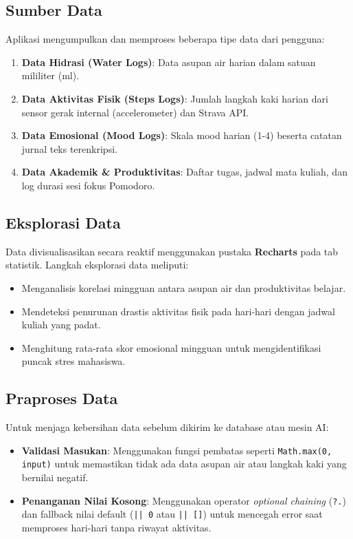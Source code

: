 \documentclass[12pt,a4paper]{article}
\begin{document}
\subsection{Sumber Data}
Aplikasi mengumpulkan dan memproses beberapa tipe data dari pengguna:
\begin{enumerate}
    \item \textbf{Data Hidrasi (Water Logs)}: Data asupan air harian dalam satuan mililiter (ml).
    \item \textbf{Data Aktivitas Fisik (Steps Logs)}: Jumlah langkah kaki harian dari sensor gerak internal (accelerometer) dan Strava API.
    \item \textbf{Data Emosional (Mood Logs)}: Skala mood harian (1-4) beserta catatan jurnal teks terenkripsi.
    \item \textbf{Data Akademik \& Produktivitas}: Daftar tugas, jadwal mata kuliah, dan log durasi sesi fokus Pomodoro.
\end{enumerate}

\subsection{Eksplorasi Data}
Data divisualisasikan secara reaktif menggunakan pustaka \textbf{Recharts} pada tab statistik. Langkah eksplorasi data meliputi:
\begin{itemize}
    \item Menganalisis korelasi mingguan antara asupan air dan produktivitas belajar.
    \item Mendeteksi penurunan drastis aktivitas fisik pada hari-hari dengan jadwal kuliah yang padat.
    \item Menghitung rata-rata skor emosional mingguan untuk mengidentifikasi puncak stres mahasiswa.
\end{itemize}

\subsection{Praproses Data}
Untuk menjaga kebersihan data sebelum dikirim ke database atau mesin AI:
\begin{itemize}
    \item \textbf{Validasi Masukan}: Menggunakan fungsi pembatas seperti \texttt{Math.max(0, input)} untuk memastikan tidak ada data asupan air atau langkah kaki yang bernilai negatif.
    \item \textbf{Penanganan Nilai Kosong}: Menggunakan operator \textit{optional chaining} (\texttt{?.}) dan fallback nilai default (\texttt{|| 0} atau \texttt{|| []}) untuk mencegah error saat memproses hari-hari tanpa riwayat aktivitas.
\end{itemize}
\end{document}
